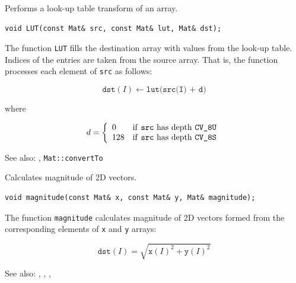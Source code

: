 \label{LUT}
Performs a look-up table transform of an array.

\begin{lstlisting}
void LUT(const Mat& src, const Mat& lut, Mat& dst);
\end{lstlisting}
\begin{description}
\end{description}

The function \texttt{LUT} fills the destination array with values from the look-up table. Indices of the entries are taken from the source array. That is, the function processes each element of \texttt{src} as follows:

\[
\texttt{dst}(I) \leftarrow \texttt{lut(src(I) + d)}
\]

where

\[
d = \left\{ \begin{array}{l l} 0 & \mbox{if \texttt{src} has depth \texttt{CV\_8U}}\\ 128 & \mbox{if \texttt{src} has depth \texttt{CV\_8S}}\\ \end{array} \right.
\]

See also: , \texttt{Mat::convertTo}

\label{magnitude}
Calculates magnitude of 2D vectors.

\begin{lstlisting}
void magnitude(const Mat& x, const Mat& y, Mat& magnitude);
\end{lstlisting}
\begin{description}
\end{description}

The function \texttt{magnitude} calculates magnitude of 2D vectors formed from the corresponding elements of \texttt{x} and \texttt{y} arrays:

\[
\texttt{dst}(I) = \sqrt{\texttt{x}(I)^2 + \texttt{y}(I)^2}
\]

See also: , , , 


